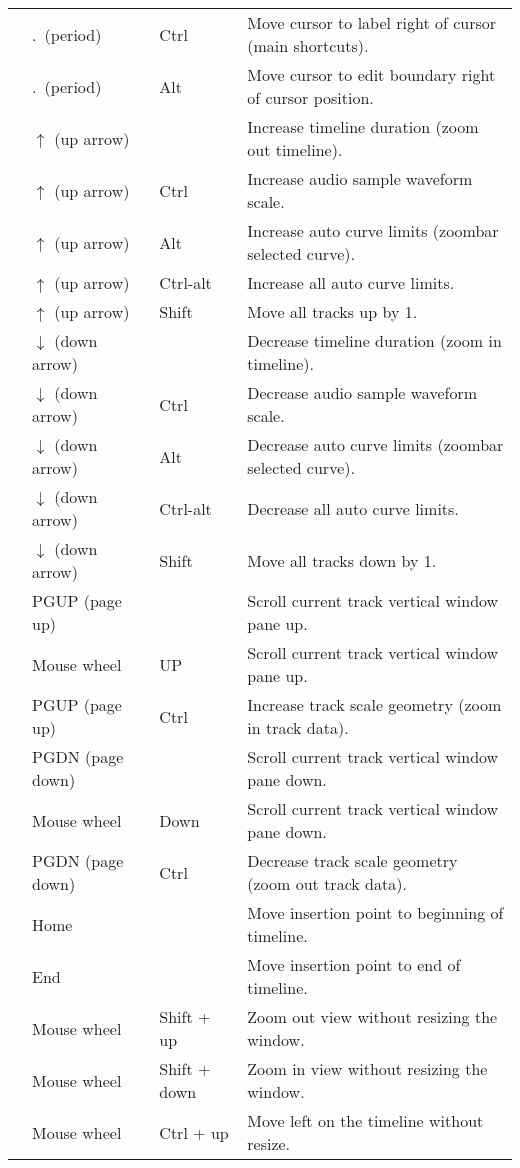 \begin{longtable}[h]{>{\bfseries}p{}p{}p{}p{}}
  & .\ (period) & Ctrl & Move cursor to label right of cursor (main shortcuts). \\
  & .\ (period) & Alt & Move cursor to edit boundary right of cursor position. \\
  & $\uparrow$ (up arrow) &  & Increase timeline duration (zoom out timeline). \\
  & $\uparrow$ (up arrow) & Ctrl & Increase audio sample waveform scale. \\
  & $\uparrow$ (up arrow) & Alt & Increase auto curve limits (zoombar selected curve). \\
  & $\uparrow$ (up arrow) & Ctrl-alt & Increase all auto curve limits. \\
  & $\uparrow$ (up arrow) & Shift & Move all tracks up by 1. \\
  & $\downarrow$ (down arrow) &  & Decrease timeline duration (zoom in timeline). \\
  & $\downarrow$ (down arrow) & Ctrl & Decrease audio sample waveform scale. \\
  & $\downarrow$ (down arrow) & Alt & Decrease auto curve limits (zoombar selected curve). \\
  & $\downarrow$ (down arrow) & Ctrl-alt & Decrease all auto curve limits. \\
  & $\downarrow$ (down arrow) & Shift & Move all tracks down by 1. \\
  & PGUP (page up) &  & Scroll current track vertical window pane up. \\
  & Mouse wheel & UP & Scroll current track vertical window pane up. \\
  & PGUP (page up) & Ctrl & Increase track scale geometry (zoom in track data). \\
  & PGDN (page down) &  & Scroll current track vertical window pane down. \\
  & Mouse wheel & Down & Scroll current track vertical window pane down. \\
  & PGDN (page down) & Ctrl & Decrease track scale geometry (zoom out track data). \\
  & Home &  & Move insertion point to beginning of timeline. \\
  & End &  & Move insertion point to end of timeline. \\
  & Mouse wheel & Shift + up & Zoom out view without resizing the window. \\
  & Mouse wheel & Shift + down & Zoom in view without resizing the window. \\
  & Mouse wheel & Ctrl + up & Move left on the timeline without resize. \\

\end{longtable}
